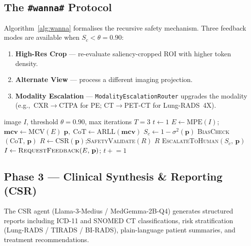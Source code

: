 \documentclass[10pt,twocolumn]{article}
\begin{document}
\subsection{The \texttt{\#wanna\#} Protocol}
\label{ssec:wanna}

Algorithm~\ref{alg:wanna} formalises the recursive safety mechanism.
Three feedback modes are available when $S_c < \theta = 0.90$:

\begin{enumerate}[noitemsep,leftmargin=*,label=\textcolor{RMoEGold}{\bfseries\arabic*.}]
  \item \textbf{High-Res Crop} — re-evaluate saliency-cropped ROI with higher
    token density.
  \item \textbf{Alternate View} — process a different imaging projection.
  \item \textbf{Modality Escalation} — \texttt{ModalityEscalationRouter} upgrades
    the modality (e.g.,~CXR$\!\to\!$CTPA for PE; CT$\!\to\!$PET-CT for Lung-RADS~4X).
\end{enumerate}

\begin{algorithm}[h]
  \caption{\texttt{\#wanna\#} Recursive Safety Protocol}
  \label{alg:wanna}
  \begin{algorithmic}[1]
    \Require image $I$,\; threshold $\theta{=}0.90$,\; max iterations $T{=}3$
    \State $t \gets 1$
    \Repeat
      \State $E \gets \mathrm{MPE}(I)$;\enspace $\mathbf{mcv} \gets \mathrm{MCV}(E)$
      \State $\mathbf{p},\;\mathrm{CoT} \gets \mathrm{ARLL}(\mathbf{mcv})$
      \State $S_c \gets 1 - \sigma^2(\mathbf{p})$
      \State \textsc{BiasCheck}$(\mathrm{CoT},\,\mathbf{p})$
        \State $R \gets \mathrm{CSR}(\mathbf{p})$;\enspace \textsc{SafetyValidate}$(R)$
        \State \Return $R$ 
        \State \Return \textsc{EscalateToHuman}$(S_c,\,\mathbf{p})$
      \Else
        \State $I \gets \textsc{RequestFeedback}(E,\,\mathbf{p})$;\enspace
               $t \mathrel{+}= 1$
      \EndIf
  \end{algorithmic}
\end{algorithm}

\subsection{Phase 3 — Clinical Synthesis \& Reporting (CSR)}
\label{ssec:csr}

The CSR agent (Llama-3-Medius / MedGemma-2B-Q4) generates structured reports
including ICD-11 and SNOMED CT classifications, risk stratification (Lung-RADS /
TIRADS / BI-RADS), plain-language patient summaries, and treatment recommendations.
\end{document}
